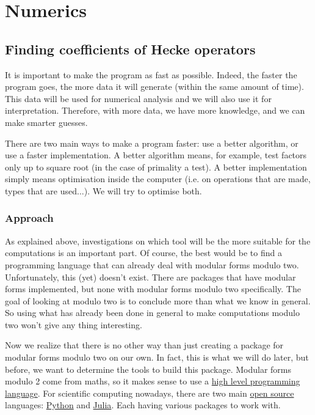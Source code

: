 \section{Numerics}
\subsection{Finding coefficients of Hecke operators}
It is important to make the program as fast as possible.
Indeed, the faster the program goes, the more data it will generate (within the same amount of time).
This data will be used for numerical analysis and we will also use it for interpretation.
Therefore, with more data, we have more knowledge, and we can make smarter guesses.

There are two main ways to make a program faster:
use a better algorithm, or 
use a faster implementation.
A better algorithm means, for example, test factors only up to square root (in the case of primality a test).
A better implementation simply means optimisation inside the computer (i.e. on operations that are made, types that are used...).
We will try to optimise both.

\subsubsection{Approach}
As explained above, investigations on which tool will be the more suitable for the computations is an important part.
Of course, the best would be to find a programming language that can already deal with modular forms modulo two.
Unfortunately, this (yet) doesn't exist.
There are packages that have modular forms implemented, but none with modular forms modulo two specifically.
The goal of looking at modulo two is to conclude more than what we know in general.
So using what has already been done in general to make computations modulo two won't give any thing interesting.

Now we realize that there is no other way than just creating a package for modular forms modulo two on our own.
In fact, this is what we will do later, but before, we want to determine the tools to build this package.
Modular forms modulo 2 come from maths, so it makes sense to use a \href{https://en.wikipedia.org/wiki/High-level_programming_language}{high level programming language}.
For scientific computing nowadays, there are two main \href{https://en.wikipedia.org/wiki/Open-source_model}{open source} languages: \href{https://en.wikipedia.org/wiki/Python_(programming_language)}{Python} and \href{https://en.wikipedia.org/wiki/Julia_(programming_language)}{Julia}.
Each having various packages to work with.

